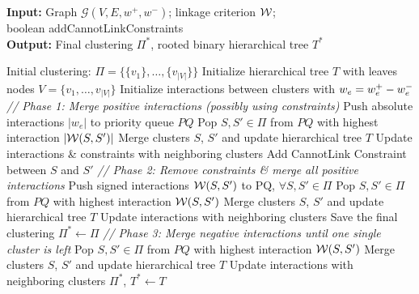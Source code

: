\begin{algorithm}[t]
\footnotesize
  \begin{flushleft}
  \footnotesize
  \caption{\algname{}}
   \hspace*{\algorithmicindent} \textbf{Input:} Graph $\mathcal{G}(V,E,w^+,w^-)$; linkage criterion $\mathcal{W}{}$; \\ 
   \hspace*{4.3em}boolean {\color{blue}addCannotLinkConstraints}  \\
  \hspace*{\algorithmicindent} \textbf{Output:} Final clustering $\Pi^*$, rooted binary hierarchical tree $T^*$\\
  \hspace*{\algorithmicindent} 
  \begin{algorithmic}[1]
  \footnotesize
      \State Initial clustering: $\Pi=\{\{v_1\}, \ldots, \{v_{|V|}\}\}$
      \State Initialize hierarchical tree $T$ with leaves nodes $V=\{v_1,\ldots,v_{|V|}\}$
      \State Initialize interactions between clusters with $w_e = w^+_e - w^-_e$
      \State \emph{// Phase 1: Merge positive interactions (possibly using constraints)}
      \State Push absolute interactions $|w_e|$ to priority queue $PQ$
      \Repeat 
        \State Pop $S,S'\in\Pi$ from $PQ$ with highest interaction $|\mathcal{W}{}(S,S')|$
          \State Merge clusters $S$, $S'$ and update hierarchical tree $T$
          \State Update interactions \& constraints with neighboring clusters
          \State Add CannotLink Constraint between $S$ and $S'$
        \EndIf
      \State \emph{// Phase 2: Remove constraints \& merge all positive interactions}
      \State Push signed interactions $\mathcal{W}{}(S,S')$ to PQ, $\forall S, S' \in \Pi$
      \Repeat 
        \State Pop $S,S'\in\Pi$ from $PQ$ with highest interaction $\mathcal{W}{}(S,S')$
          \State Merge clusters $S$, $S'$ and update hierarchical tree $T$
          \State Update interactions with neighboring clusters
        \EndIf
      \State Save the final clustering $\Pi^* \gets \Pi$ 
      \State \emph{// Phase 3: Merge negative interactions until one single cluster is left}
      \Repeat
        \State Pop $S,S'\in\Pi$ from $PQ$ with highest interaction $\mathcal{W}{}(S,S')$
        \State Merge clusters $S$, $S'$ and update hierarchical tree $T$
        \State Update interactions with neighboring clusters
      \State
      \Return $\Pi^*$, $T^*\gets T$
  \end{algorithmic}
    \label{main_alg}
  \end{flushleft}


\end{algorithm}
